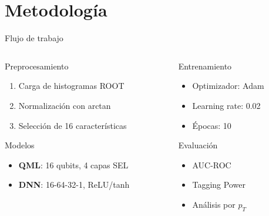 \documentclass[aspectratio=43]{beamer}
\begin{document}
\section{Metodología}

\begin{frame}{Flujo de trabajo}
  \begin{columns}
    \begin{column}{0.48\textwidth}
      \begin{block}{Preprocesamiento}
        \begin{enumerate}
          \item Carga de histogramas ROOT
          \item Normalización con arctan
          \item Selección de 16 características
        \end{enumerate}
      \end{block}
      \vspace{-0.2em}
      \begin{block}{Modelos}
        \begin{itemize}
          \item \textbf{QML}: 16 qubits, 4 capas SEL
          \item \textbf{DNN}: 16-64-32-1, ReLU/tanh
        \end{itemize}
      \end{block}
    \end{column}
    \begin{column}{0.48\textwidth}
      \begin{alertblock}{Entrenamiento}
        \begin{itemize}
          \item Optimizador: Adam
          \item Learning rate: 0.02
          \item Épocas: 10
        \end{itemize}
      \end{alertblock}
      \vspace{-0.2em}
      \begin{block}{Evaluación}
        \begin{itemize}
          \item AUC-ROC
          \item Tagging Power
          \item Análisis por \texorpdfstring{$p_T$}{pT}
        \end{itemize}
      \end{block}
    \end{column}
  \end{columns}
\end{frame}
\end{document}
